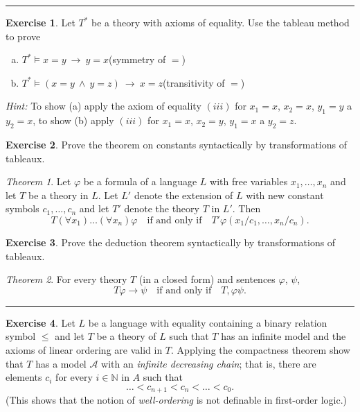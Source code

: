 \documentclass[11pt,a4paper]{amsart}
\theoremstyle{definition}
\newtheorem{problem}{Exercise}
\theoremstyle{remark}
\newtheorem*{theorem*}{Theorem}
\begin{document}
\smallskip
\hrule

\begin{problem} Let $T^*$ be a theory with axioms of equality. Use the tableau method to prove
\begin{enumerate}[(a)]
\itemsep6pt
\item $T^*\models x=y\ \to\ y=x$\hfill(symmetry of $=$)
\item $T^*\models (x=y\ \wedge\ y=z)\ \to\ x=z$\hfill(transitivity of $=$)
\end{enumerate}

\smallskip
{\it Hint:} To show (a) apply the axiom of equality $(iii)$ for $x_1=x$, $x_2=x$, $y_1=y$ a $y_2=x$, \newline
to show (b) apply $(iii)$ for $x_1=x$, $x_2=y$, $y_1=x$ a $y_2=z$.
\end{problem} 

\smallskip

\begin{problem} Prove the theorem on constants syntactically by transformations of tableaux.

\smallskip

\begin{theorem*} Let $\varphi$ be a formula of a language $L$ with free variables $x_1,\dots,x_n$ and let $T$ be a theory in $L$. Let $L'$ denote the extension of $L$ with new constant symbols $c_1,\dots,c_n$ and let $T'$ denote the theory $T$ in $L'$. Then
$$T  (\forall x_1)\dots(\forall x_n)\varphi \quad\text{if and only if}\quad T'\varphi(x_1/c_1,\dots,x_n/c_n).$$
\end{theorem*}
\end{problem} 

\smallskip


\begin{problem} Prove the deduction theorem syntactically by transformations of tableaux.

\smallskip

\begin{theorem*} For every theory $T$ (in a closed form) and sentences $\varphi$, $\psi$,
$$T \varphi\to\psi\quad\text{if and only if}\quad T,\varphi\psi.$$
\end{theorem*}
\end{problem} 

\smallskip
\hrule



\begin{problem} Let $L$ be a language with equality containing a binary relation symbol $\le$ and let $T$ be a theory of $L$ such that $T$ has an infinite model and the axioms of linear ordering are valid in $T$. Applying the compactness theorem show that $T$ has a model $\mathcal{A}$ with an \emph{infinite decreasing chain}; that is, there are elements $c_i$ for every $i\in \mathbb{N}$ in $A$ such that
    $$\dots < c_{n+1} < c_n< \dots <c_0.$$
    (This shows that the notion of \emph{well-ordering} is not definable in first-order logic.)
\end{problem}
\end{document}
